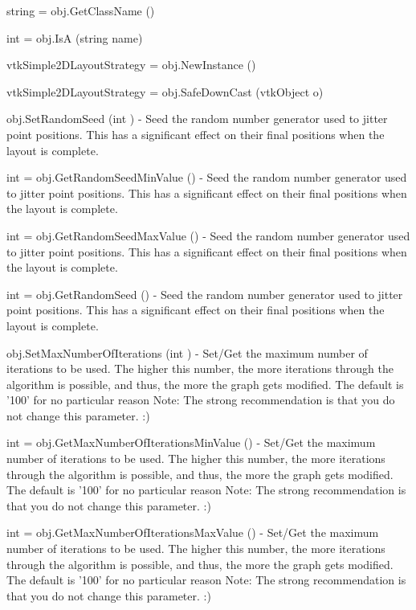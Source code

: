 \begin{DoxyItemize}
\item {\ttfamily string = obj.\-Get\-Class\-Name ()}  
\item {\ttfamily int = obj.\-Is\-A (string name)}  
\item {\ttfamily vtk\-Simple2\-D\-Layout\-Strategy = obj.\-New\-Instance ()}  
\item {\ttfamily vtk\-Simple2\-D\-Layout\-Strategy = obj.\-Safe\-Down\-Cast (vtk\-Object o)}  
\item {\ttfamily obj.\-Set\-Random\-Seed (int )} -\/ Seed the random number generator used to jitter point positions. This has a significant effect on their final positions when the layout is complete.  
\item {\ttfamily int = obj.\-Get\-Random\-Seed\-Min\-Value ()} -\/ Seed the random number generator used to jitter point positions. This has a significant effect on their final positions when the layout is complete.  
\item {\ttfamily int = obj.\-Get\-Random\-Seed\-Max\-Value ()} -\/ Seed the random number generator used to jitter point positions. This has a significant effect on their final positions when the layout is complete.  
\item {\ttfamily int = obj.\-Get\-Random\-Seed ()} -\/ Seed the random number generator used to jitter point positions. This has a significant effect on their final positions when the layout is complete.  
\item {\ttfamily obj.\-Set\-Max\-Number\-Of\-Iterations (int )} -\/ Set/\-Get the maximum number of iterations to be used. The higher this number, the more iterations through the algorithm is possible, and thus, the more the graph gets modified. The default is '100' for no particular reason Note\-: The strong recommendation is that you do not change this parameter. \-:)  
\item {\ttfamily int = obj.\-Get\-Max\-Number\-Of\-Iterations\-Min\-Value ()} -\/ Set/\-Get the maximum number of iterations to be used. The higher this number, the more iterations through the algorithm is possible, and thus, the more the graph gets modified. The default is '100' for no particular reason Note\-: The strong recommendation is that you do not change this parameter. \-:)  
\item {\ttfamily int = obj.\-Get\-Max\-Number\-Of\-Iterations\-Max\-Value ()} -\/ Set/\-Get the maximum number of iterations to be used. The higher this number, the more iterations through the algorithm is possible, and thus, the more the graph gets modified. The default is '100' for no particular reason Note\-: The strong recommendation is that you do not change this parameter. \-:)  

\end{DoxyItemize}
